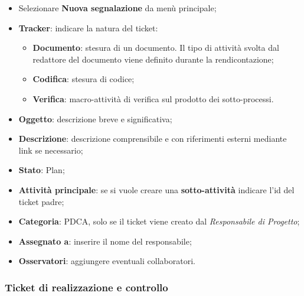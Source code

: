 \begin{itemize}


\item Selezionare \textbf{Nuova segnalazione} da menù principale; 
\item \textbf{Tracker}: indicare la natura del ticket: 
	\begin{itemize}
	\item \textbf{Documento}: stesura di un documento. Il tipo di attività svolta dal redattore del documento viene definito durante la rendicontazione; 
	\item \textbf{Codifica}: stesura di codice; 
	\item \textbf{Verifica}: macro-attività di verifica sul prodotto dei sotto-processi. 


	\end{itemize}

\item \textbf{Oggetto}: descrizione breve e significativa; 
\item \textbf{Descrizione}: descrizione comprensibile e con riferimenti esterni mediante link se necessario; 
\item \textbf{Stato}: Plan; 
\item \textbf{Attività principale}: se si vuole creare una \textbf{sotto-attività} indicare l’id del ticket 
padre; 
\item \textbf{Categoria}: PDCA, solo se il ticket viene creato dal \emph{Responsabile di Progetto}; 
\item \textbf{Assegnato a}: inserire il nome del responsabile; 
\item \textbf{Osservatori}: aggiungere eventuali collaboratori.
\end{itemize}  


\subsubsection{Ticket di realizzazione e controllo} 

